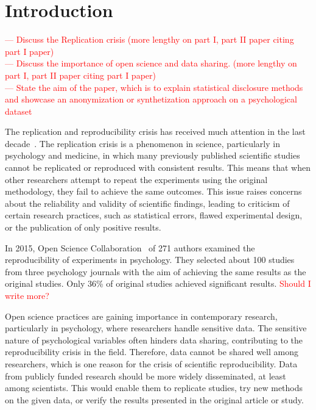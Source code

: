 \documentclass{article}
\begin{document}
\section{Introduction}


\textcolor{red}{— Discuss the Replication crisis (more lengthy on part I, part II paper citing part I paper)} \\
\textcolor{red}{— Discuss the importance of open science and data sharing. (more lengthy on part I, part II paper citing part I paper)} \\
\textcolor{red}{— State the aim of the paper, which is to explain statistical disclosure methods and showcase an anonymization or synthetization approach on a psychological dataset}

The replication and reproducibility crisis has received much attention in the last decade~\cite{2012_Yong}. The replication crisis is a phenomenon in science, particularly in psychology and medicine, in which many previously published scientific studies cannot be replicated or reproduced with consistent results. This means that when other researchers attempt to repeat the experiments using the original methodology, they fail to achieve the same outcomes. This issue raises concerns about the reliability and validity of scientific findings, leading to criticism of certain research practices, such as statistical errors, flawed experimental design, or the publication of only positive results.

In 2015, Open Science Collaboration~\cite{2015_OSC} of 271 authors examined the reproducibility of experiments in psychology. They selected about 100 studies from three psychology journals with the aim of achieving the same results as the original studies.  Only 36\% of original studies achieved significant results.
\textcolor{red}{Should I write more?}
\newline

Open science practices are gaining importance in contemporary research, particularly in psychology, where researchers handle sensitive data. The sensitive nature of psychological variables often hinders data sharing, contributing to the reproducibility crisis in the field.
Therefore, data cannot be shared well among researchers, which is one reason for the crisis of scientific reproducibility. Data from publicly funded research should be more widely disseminated, at least among scientists. This would enable them to replicate studies, try new methods on the given data, or verify the results presented in the original article or study.
\newline
\end{document}
